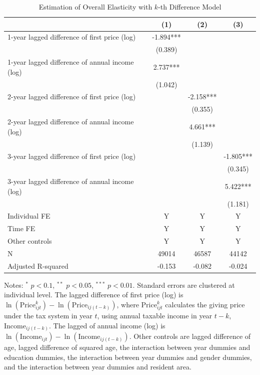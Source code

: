\documentclass[
  11pt,
  a4paper,
]{article}
\begin{document}
\begin{table}

\caption{\label{tab:kdiffOverall}Estimation of Overall Elasticity with $k$-th Difference Model}
\centering
\fontsize{9}{11}\selectfont
\begin{threeparttable}
\begin{tabular}[t]{lccc}
\toprule
 & (1) & (2) & (3)\\
\midrule
1-year lagged difference of first price (log) & -1.894*** &  & \\
 & (0.389) &  & \\
1-year lagged difference of annual income (log) & 2.737*** &  & \\
 & (1.042) &  & \\
2-year lagged difference of first price (log) &  & -2.158*** & \\
 &  & (0.355) & \\
2-year lagged difference of annual income (log) &  & 4.661*** & \\
 &  & (1.139) & \\
3-year lagged difference of first price (log) &  &  & -1.805***\\
 &  &  & (0.345)\\
3-year lagged difference of annual income (log) &  &  & 5.422***\\
 &  &  & (1.181)\\
Individual FE & Y & Y & Y\\
Time FE & Y & Y & Y\\
Other controls & Y & Y & Y\\
N & 49014 & 46587 & 44142\\
Adjusted R-squared & -0.153 & -0.082 & -0.024\\
\bottomrule
\end{tabular}
\begin{tablenotes}
\item Notes: $^{*}$ $p < 0.1$, $^{**}$ $p < 0.05$, $^{***}$ $p < 0.01$. Standard errors are clustered at individual level. The lagged difference of first price (log) is $\ln(\text{Price}^k_{ijt}) - \ln(\text{Price}_{ij(t-k)})$, where $\text{Price}^k_{ijt}$ calculates the giving price under the tax system in year $t$, using annual taxable income in year $t-k$, $\text{Income}_{ij(t-k)}$. The lagged of annual income (log) is $\ln(\text{Income}_{ijt}) - \ln(\text{Income}_{ij(t-k)})$. Other controls are lagged difference of age, lagged difference of squared age, the interaction between year dummies and education dummies, the interaction between year dummies and gender dummies, and the interaction between year dummies and resident area.
\end{tablenotes}
\end{threeparttable}
\end{table}
\end{document}
